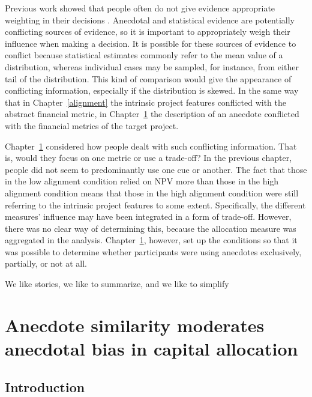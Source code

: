 \documentclass[a4paper, nobind, dvipsnames]{templates/ociamthesis}
\theoremstyle{definition}
\theoremstyle{definition}
\theoremstyle{definition}
\theoremstyle{definition}
\theoremstyle{remark}
\begin{document}
Previous work showed that people often do not give evidence appropriate
weighting in their decisions \autocite{griffin1992}. Anecdotal and statistical evidence
are potentially conflicting sources of evidence, so it is important to
appropriately weigh their influence when making a decision. It is possible for
these sources of evidence to conflict because statistical estimates commonly
refer to the mean value of a distribution, whereas individual cases may be
sampled, for instance, from either tail of the distribution. This kind of
comparison would give the appearance of conflicting information, especially if
the distribution is skewed. In the same way that in Chapter~\ref{alignment} the
intrinsic project features conflicted with the abstract financial metric, in
Chapter~\ref{anecdotes} the description of an anecdote conflicted with the
financial metrics of the target project.

Chapter~\ref{anecdotes} considered how people dealt with such conflicting
information. That is, would they focus on one metric or use a trade-off? In the
previous chapter, people did not seem to predominantly use one cue or another.
The fact that those in the low alignment condition relied on NPV more than those
in the high alignment condition means that those in the high alignment condition
were still referring to the intrinsic project features to some extent.
Specifically, the different measures' influence may have been integrated in a
form of trade-off. However, there was no clear way of determining this, because
the allocation measure was aggregated in the analysis. Chapter~\ref{anecdotes},
however, set up the conditions so that it was possible to determine whether
participants were using anecdotes exclusively, partially, or not at all.



\begin{savequote}
We like stories, we like to summarize, and we like to simplify
\end{savequote}

\hypertarget{anecdotes}{%
\chapter{Anecdote similarity moderates anecdotal bias in capital allocation}\label{anecdotes}}

\minitoc

\section{Introduction}
\end{document}
